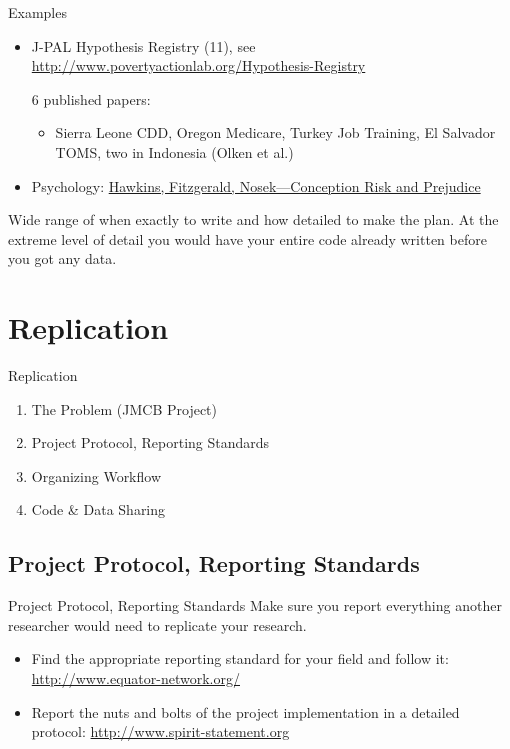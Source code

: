 \documentclass{beamer}
\begin{document}
\begin{frame}{Examples}

\begin{itemize}[<.->]
\item
J-PAL Hypothesis Registry (11), see \url{http://www.povertyactionlab.org/Hypothesis-Registry}

6 published papers:
\begin{itemize}
\item
 Sierra Leone CDD, Oregon Medicare, Turkey Job Training, El Salvador TOMS, two in Indonesia (Olken et al.)
\end{itemize}
\item Psychology: \href{http://pss.sagepub.com/content/26/2/249}{Hawkins, Fitzgerald, Nosek---Conception Risk and Prejudice}
\end{itemize} 
\vspace{0.25in}
Wide range of when exactly to write and how detailed to make the plan. At the extreme level of detail you would have your entire code already written before you got any data.
\end{frame}

\section{Replication}
\begin{frame}{Replication}
\begin{enumerate}[<.->]
 \item The Problem	(JMCB Project)
 \item Project Protocol, Reporting Standards
 \item Organizing Workflow
 \item Code \& Data Sharing
\end{enumerate}
\end{frame}

\subsection*{Project Protocol, Reporting Standards}
\begin{frame}[<.->]{Project Protocol, Reporting Standards}
 Make sure you report everything another researcher would need to replicate your research.
 \begin{itemize}
 \item Find the appropriate reporting standard for your field and follow it: \url{http://www.equator-network.org/}
\item Report the nuts and bolts of the project implementation in a detailed protocol: \url{http://www.spirit-statement.org}
\end{itemize}
\end{frame}
\end{document}
